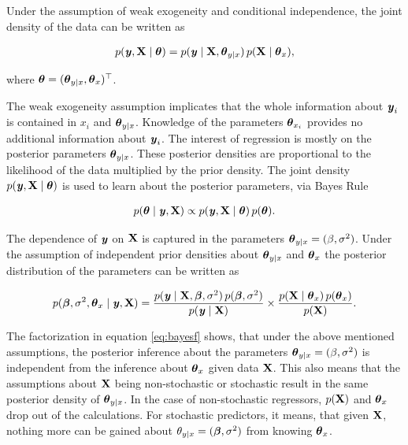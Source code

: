 \documentclass[11pt,a4paper,twoside]{book}\usepackage[]{graphicx}\usepackage[]{color}
\begin{document}
Under the assumption of weak exogeneity and conditional independence, the joint density of the data can be written as

       \begin{align*} 
p({\textbf{\textit{y}}}, {\mathbf{X}} \mid {\boldsymbol{\theta}}{}) = p({\textbf{\textit{y}}} \mid {\mathbf{X}}, {\boldsymbol{\theta}}{}_{y \mid x}) \, p({\mathbf{X}} \mid {\boldsymbol{\theta}}{}_{x}),
   \end{align*}

where ${\boldsymbol{\theta}}{} = ({\boldsymbol{\theta}}{}_{y \mid x}, {\boldsymbol{\theta}}{}_{x})^\top$. 

The weak exogeneity assumption implicates that the whole information about ${\textbf{\textit{y}}}_{i}$ is contained in $x_{i}$ and ${\boldsymbol{\theta}}{}_{y \mid x}$. Knowledge of the parameters ${\boldsymbol{\theta}}{}_{x_{i}}$ provides no additional information about ${\textbf{\textit{y}}}_{i}$.
The interest of regression is mostly on the posterior parameters ${\boldsymbol{\theta}}{}_{y \mid x}$. These posterior densities are proportional to the likelihood of the data  multiplied by the prior density. The joint density $p({\textbf{\textit{y}}}, {\mathbf{X}} \mid  {\boldsymbol{\theta}}{})$ is used to learn about the posterior parameters, via Bayes Rule

       \begin{align*} 
p({\boldsymbol{\theta}}{} \mid {\textbf{\textit{y}}}, {\mathbf{X}}) \propto p({\textbf{\textit{y}}}, {\mathbf{X}} \mid  {\boldsymbol{\theta}}{}) \, p({\boldsymbol{\theta}}{}).
   \end{align*}
   
   The dependence of ${\textbf{\textit{y}}}$ on ${\mathbf{X}}$ is captured in the parameters ${\boldsymbol{\theta}}{}_{y \mid x} = (\beta, \sigma^2)$. Under the assumption of independent prior densities about ${\boldsymbol{\theta}}{}_{y \mid x}$ and ${\boldsymbol{\theta}}{}_{x}$ the posterior distribution of the parameters can be written as
   
          \begin{align} 
p({\boldsymbol{\beta}}, \sigma^2, {\boldsymbol{\theta}}{}_{x} \mid {\textbf{\textit{y}}}, {\mathbf{X}}) = \frac{p({\textbf{\textit{y}}} \mid {\mathbf{X}}, {\boldsymbol{\beta}}, \sigma^2) \, p({\boldsymbol{\beta}}, \sigma^2)}{p({\textbf{\textit{y}}} \mid {\mathbf{X}})} \times \frac{p({\mathbf{X}} \mid {\boldsymbol{\theta}}{}_{x}) \, p({\boldsymbol{\theta}}{}_{x})}{p({\mathbf{X}})}.  \label{eq:bayesf} 
   \end{align}
   
  The factorization in equation \ref{eq:bayesf} shows, that under the above mentioned assumptions, the posterior inference about the parameters ${\boldsymbol{\theta}}{}_{y \mid x} = (\beta, \sigma^2)$ is independent from the inference about ${\boldsymbol{\theta}}{}_{x}$ given data ${\mathbf{X}}$. This also means that the assumptions about ${\mathbf{X}}$ being non-stochastic or stochastic result in the same posterior density of  ${\boldsymbol{\theta}}{}_{y \mid x}$. In the case of non-stochastic regressors, $p({\mathbf{X}})$ and ${\boldsymbol{\theta}}{}_{x}$ drop out of the calculations. For stochastic predictors, it means, that given ${\mathbf{X}}$, nothing more can be gained about $\theta_{y \mid x} = ({\boldsymbol{\beta}}, \sigma^2)$ from knowing ${\boldsymbol{\theta}}{}_{x}$. 
  
\end{document}
